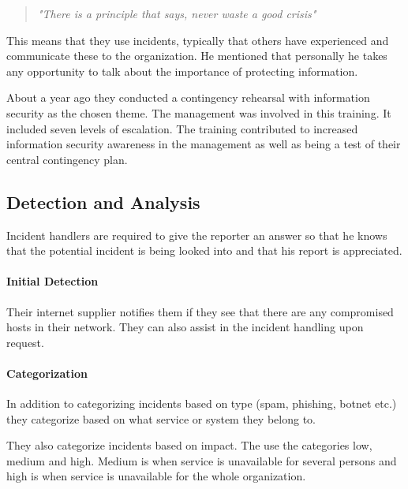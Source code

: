 \begin{quote}
\textit{"There is a principle that says, never waste a good crisis"}
\end{quote}

This means that they use incidents, typically that others have experienced and communicate these to the organization. He mentioned that personally he takes any opportunity to talk about the importance of protecting information.

About a year ago they conducted a contingency rehearsal with information security as the chosen theme. The management was involved in this training. It included seven levels of escalation. The training contributed to increased information security awareness in the management as well as being a test of their central contingency plan.

\subsection{Detection and Analysis}
Incident handlers are required to give the reporter an answer so that he knows that the potential incident is being looked into and that his report is appreciated.

\paragraph{Initial Detection}
Their internet supplier notifies them if they see that there are any compromised hosts in their network. They can also assist in the incident handling upon request.

\paragraph{Categorization}
In addition to categorizing incidents based on type (spam, phishing, botnet etc.) they categorize based on what service or system they belong to.

They also categorize incidents based on impact. The use the categories low, medium and high. Medium is when service is unavailable for several persons and high is when service is unavailable for the whole organization.

